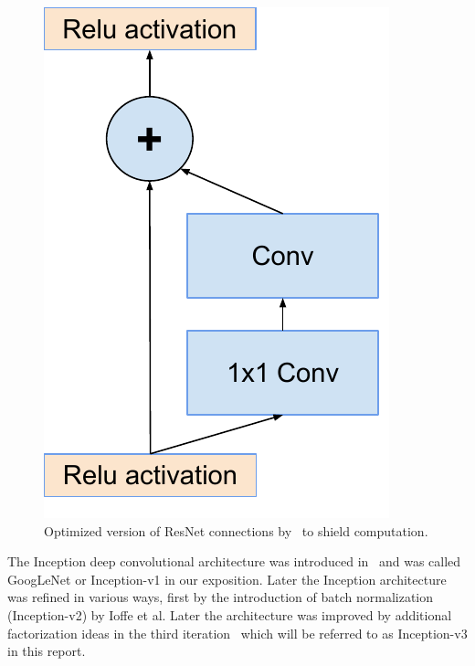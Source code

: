 \begin{figure}
\centering
\includegraphics[width=0.5\linewidth]{resnetoptimized}
\caption{Optimized version of ResNet connections by~\cite{he2015deep} to
  shield computation.}
\label{fig:resnetoptimized}
\end{figure}
The Inception deep convolutional architecture was introduced
in~\cite{szegedy2015going} and was called GoogLeNet or Inception-v1 in our
exposition.
Later the Inception architecture was refined in various ways,
first by the introduction of batch normalization
~\cite{ioffe2015batch} (Inception-v2) by Ioffe et al.
Later the architecture was improved by additional factorization ideas in the
third iteration~\cite{szegedy2015rethinking} which will be referred to as
Inception-v3 in this report.
